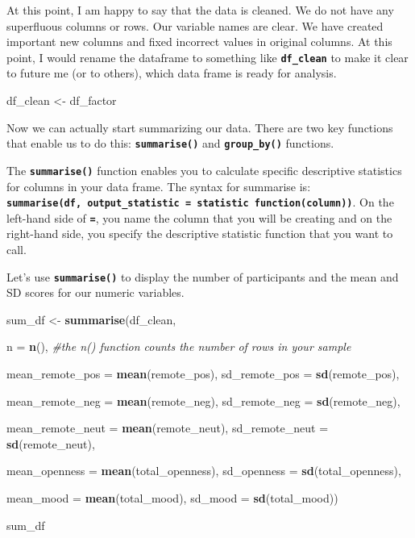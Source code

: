 \documentclass[
]{book}
\newenvironment{Shaded}{\begin{snugshade}}{\end{snugshade}}
\newcommand{\AttributeTok}[1]{\textcolor[rgb]{0.13,0.29,0.53}{#1}}
\newcommand{\CommentTok}[1]{\textcolor[rgb]{0.56,0.35,0.01}{\textit{#1}}}
\newcommand{\FunctionTok}[1]{\textcolor[rgb]{0.13,0.29,0.53}{\textbf{#1}}}
\newcommand{\NormalTok}[1]{#1}
\newcommand{\OtherTok}[1]{\textcolor[rgb]{0.56,0.35,0.01}{#1}}
\begin{document}
At this point, I am happy to say that the data is cleaned. We do not have any superfluous columns or rows. Our variable names are clear. We have created important new columns and fixed incorrect values in original columns. At this point, I would rename the dataframe to something like \textbf{\texttt{df\_clean}} to make it clear to future me (or to others), which data frame is ready for analysis.

\begin{Shaded}
\begin{Highlighting}[]
\NormalTok{df\_clean }\OtherTok{\textless{}{-}}\NormalTok{ df\_factor}
\end{Highlighting}
\end{Shaded}

Now we can actually start summarizing our data. There are two key functions that enable us to do this: \textbf{\texttt{summarise()}} and \textbf{\texttt{group\_by()}} functions.

The \textbf{\texttt{summarise()}} function enables you to calculate specific descriptive statistics for columns in your data frame. The syntax for summarise is: \textbf{\texttt{summarise(df,\ output\_statistic\ =\ statistic\ function(column))}}. On the left-hand side of \textbf{\texttt{=}}, you name the column that you will be creating and on the right-hand side, you specify the descriptive statistic function that you want to call.

Let's use \textbf{\texttt{summarise()}} to display the number of participants and the mean and SD scores for our numeric variables.

\begin{Shaded}
\begin{Highlighting}[]
\NormalTok{sum\_df }\OtherTok{\textless{}{-}} \FunctionTok{summarise}\NormalTok{(df\_clean, }
          
          \AttributeTok{n =} \FunctionTok{n}\NormalTok{(), }\CommentTok{\#the n() function counts the number of rows in your sample}
          
          \AttributeTok{mean\_remote\_pos =} \FunctionTok{mean}\NormalTok{(remote\_pos),}
          \AttributeTok{sd\_remote\_pos =} \FunctionTok{sd}\NormalTok{(remote\_pos),}
          
          \AttributeTok{mean\_remote\_neg =} \FunctionTok{mean}\NormalTok{(remote\_neg),}
          \AttributeTok{sd\_remote\_neg =} \FunctionTok{sd}\NormalTok{(remote\_neg),}
          
          \AttributeTok{mean\_remote\_neut =} \FunctionTok{mean}\NormalTok{(remote\_neut),}
          \AttributeTok{sd\_remote\_neut =} \FunctionTok{sd}\NormalTok{(remote\_neut),}
          
          \AttributeTok{mean\_openness =} \FunctionTok{mean}\NormalTok{(total\_openness),}
          \AttributeTok{sd\_openness =} \FunctionTok{sd}\NormalTok{(total\_openness),}
          
          \AttributeTok{mean\_mood =} \FunctionTok{mean}\NormalTok{(total\_mood),}
          \AttributeTok{sd\_mood =} \FunctionTok{sd}\NormalTok{(total\_mood))}

\NormalTok{sum\_df}
\end{Highlighting}
\end{Shaded}
\end{document}
